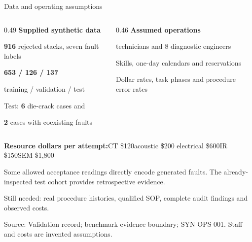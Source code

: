 \documentclass[aspectratio=169,11pt]{beamer}
\newcommand{\source}[1]{\vfill{\fontsize{6.6}{8}\selectfont\color{Muted}Source: #1\par}}
\newcommand{\smalltext}[1]{{\fontsize{9}{11.4}\selectfont #1\par}}
\begin{document}
\begin{frame}[t]{Data and operating assumptions}
  \begin{columns}[T,onlytextwidth]
    \begin{column}{0.49\textwidth}
      {\large\bfseries Supplied synthetic data}\par\medskip
      \textbf{916} rejected stacks, seven fault labels\par\smallskip
      \textbf{653 / 126 / 137}\par
      training / validation / test\par\smallskip
      Test: \textbf{6} die-crack cases and\par
      \textbf{2} cases with coexisting faults
    \end{column}
    \begin{column}{0.46\textwidth}
      {\large\bfseries Assumed operations}\par{} technicians and 8 diagnostic engineers\par\smallskip
      Skills, one-day calendars and reservations\par\smallskip
      Dollar rates, task phases and procedure error rates
    \end{column}
  \end{columns}
  \vspace{4mm}
  \smalltext{\textbf{Resource dollars per attempt:}\quad CT \$120\quad acoustic \$200\quad
    electrical \$600\quad IR \$150\quad SEM \$1,800}
  \vspace{2mm}
  \smalltext{\alert{Some allowed acceptance readings directly encode generated faults.}
    The already-inspected test cohort provides retrospective evidence.}
  \vspace{1.5mm}
  \smalltext{Still needed: real procedure histories, qualified SOP, complete audit findings and observed costs.}
  \source{Validation record; benchmark evidence boundary; SYN-OPS-001. Staff and costs are invented assumptions.}
  \note{\SlideThreeNotes}
\end{frame}
\end{document}
